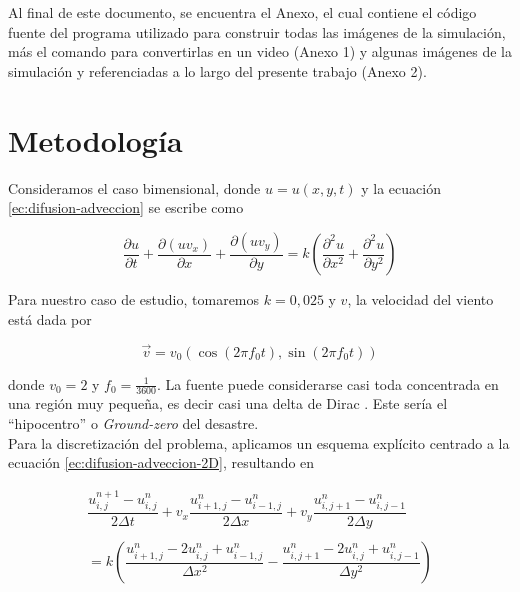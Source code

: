 \documentclass[twocolumn,a4paper,10pt]{article}
\begin{document}
Al final de este documento, se encuentra el Anexo, el cual contiene el c\'odigo fuente del programa utilizado para construir todas las im\'agenes de la simulaci\'on, 
m\'as el comando para convertirlas en un video (Anexo 1) y  algunas im\'agenes de la simulaci\'on y referenciadas a lo largo del presente trabajo (Anexo 2).\\

\section{Metodolog\'ia}
\label{sec:metodologia}
Consideramos el caso bimensional, donde $u = u(x,y,t)$ y la ecuaci\'on \ref{ec:difusion-adveccion} se escribe como \cite{Guia2-MNA}

\begin{equation}
\label{ec:difusion-adveccion-2D}
\frac{\partial u}{\partial t} + \frac{\partial (uv_{x})}{\partial x} + \frac{\partial (uv_{y})}{\partial y}  = k \left(\frac{\partial^2 u}{\partial x^2} + \frac{\partial^2 u}{\partial y^2}\right)
\end{equation}

Para nuestro caso de estudio, tomaremos $k = 0,025$ y $v$, la velocidad del viento est\'a dada por 

\begin{equation}
    \vec{v} = v_{0}(\cos (2\pi f_{0}t), \sin (2\pi f_{0}t))
\end{equation}

donde $v_{0} = 2$ y $f_{0} = \frac{1}{3600}$. La fuente puede considerarse casi toda concentrada en una regi\'on muy pequeña, es decir casi una 
delta de Dirac \cite{Guia2-MNA}. Este sería el ``hipocentro'' o \textit{Ground-zero} \cite{Ground-zero} del desastre. \\

Para la discretizaci\'on del problema, aplicamos un esquema expl\'icito centrado a la ecuaci\'on \ref{ec:difusion-adveccion-2D}, resultando en 

\begin{equation}
\label{ec:discretizacion}
\begin{array}{c}
\dfrac{u_{i,j}^{n+1} - u_{i,j}^{n}}{2\Delta t} + v_{x}\dfrac{u_{i+1,j}^{n} - u_{i-1,j}^{n}}{2\Delta x} +  v_{y}\dfrac{u_{i,j+1}^{n} - u_{i,j-1}^{n}}{2\Delta y} \\
    \\
    = k \left( \dfrac{u_{i+1,j}^{n} - 2u_{i,j}^{n} + u_{i-1,j}^{n}}{\Delta x^2} - \dfrac{u_{i,j+1}^{n} - 2u_{i,j}^{n} + u_{i,j-1}^{n}}{\Delta y^2}  \right)
\end{array}       
\end{equation}
\end{document}

